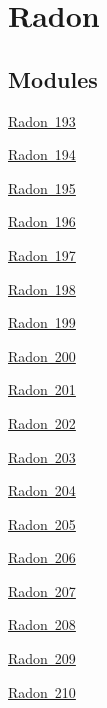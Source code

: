 \hypertarget{group___isotope_const-_radon}{}\section{Radon}
\label{group___isotope_const-_radon}
\subsection*{Modules}
\begin{DoxyCompactItemize}
\item 
\mbox{\hyperlink{group___isotope_const-_radon-_rn193}{Radon 193}}
\item 
\mbox{\hyperlink{group___isotope_const-_radon-_rn194}{Radon 194}}
\item 
\mbox{\hyperlink{group___isotope_const-_radon-_rn195}{Radon 195}}
\item 
\mbox{\hyperlink{group___isotope_const-_radon-_rn196}{Radon 196}}
\item 
\mbox{\hyperlink{group___isotope_const-_radon-_rn197}{Radon 197}}
\item 
\mbox{\hyperlink{group___isotope_const-_radon-_rn198}{Radon 198}}
\item 
\mbox{\hyperlink{group___isotope_const-_radon-_rn199}{Radon 199}}
\item 
\mbox{\hyperlink{group___isotope_const-_radon-_rn200}{Radon 200}}
\item 
\mbox{\hyperlink{group___isotope_const-_radon-_rn201}{Radon 201}}
\item 
\mbox{\hyperlink{group___isotope_const-_radon-_rn202}{Radon 202}}
\item 
\mbox{\hyperlink{group___isotope_const-_radon-_rn203}{Radon 203}}
\item 
\mbox{\hyperlink{group___isotope_const-_radon-_rn204}{Radon 204}}
\item 
\mbox{\hyperlink{group___isotope_const-_radon-_rn205}{Radon 205}}
\item 
\mbox{\hyperlink{group___isotope_const-_radon-_rn206}{Radon 206}}
\item 
\mbox{\hyperlink{group___isotope_const-_radon-_rn207}{Radon 207}}
\item 
\mbox{\hyperlink{group___isotope_const-_radon-_rn208}{Radon 208}}
\item 
\mbox{\hyperlink{group___isotope_const-_radon-_rn209}{Radon 209}}
\item 
\mbox{\hyperlink{group___isotope_const-_radon-_rn210}{Radon 210}}
\item 

\end{DoxyCompactItemize}
